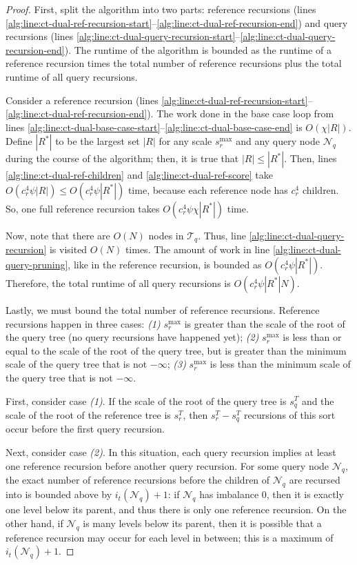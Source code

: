 \begin{proof}
First, split the algorithm into two parts: reference recursions (lines
\ref{alg:line:ct-dual-ref-recursion-start}--\ref{alg:line:ct-dual-ref-recursion-end})
and query recursions (lines
\ref{alg:line:ct-dual-query-recursion-start}--\ref{alg:line:ct-dual-query-recursion-end}).
The runtime of the algorithm is bounded as the runtime of a reference recursion
times the total number of reference recursions plus the total runtime of all
query recursions.

Consider a reference recursion (lines
\ref{alg:line:ct-dual-ref-recursion-start}--\ref{alg:line:ct-dual-ref-recursion-end}).
The work done in the base case loop from lines
\ref{alg:line:ct-dual-base-case-start}--\ref{alg:line:ct-dual-base-case-end} is
$O(\chi | R |)$.  Define $| R^* |$ to be the largest set $|R|$ for any scale
$s_r^{\max}$ and any query node $\mathscr{N}_q$ during the course of the
algorithm; then, it is true that $| R | \le | R^* |$.
%
Then, lines \ref{alg:line:ct-dual-ref-children} and
\ref{alg:line:ct-dual-ref-score} take $O(c_r^4 \psi | R |) \le O(c_r^4 \psi |
R^* |)$ time, because each reference node has $c_r^4$ children.  So, one
full reference recursion takes $O(c_r^4 \psi \chi | R^* |)$ time.

Now, note that there are $O(N)$ nodes in $\mathscr{T}_q$.  Thus, line
\ref{alg:line:ct-dual-query-recursion} is visited $O(N)$ times.  The amount of
work in line \ref{alg:line:ct-dual-query-pruning}, like in the reference
recursion, is bounded as $O(c_r^4 \psi | R^* |)$. Therefore, the total
runtime of all query recursions is $O(c_r^4 \psi | R^* | N)$.

Lastly, we must bound the total number of reference recursions.  Reference
recursions happen in three cases: \textit{(1)} $s_r^{\max}$ is greater than the
scale of the root of the query tree (no query recursions have happened yet);
\textit{(2)} $s_r^{\max}$ is less than or equal to the scale of the root of the
query tree, but is greater than the minimum scale of the query tree that is not
$-\infty$; \textit{(3)} $s_r^{\max}$ is less than the minimum scale of the query
tree that is not $-\infty$.

First, consider case \textit{(1)}.  If the scale of the root of the query tree
is $s_q^T$ and the scale of the root of the reference tree is $s_r^T$, then
$s_r^T - s_q^T$ recursions of this sort occur before the first query recursion.

Next, consider case \textit{(2)}.  In this situation, each query recursion
implies at least one reference recursion before another query recursion.  For
some query node $\mathscr{N}_q$, the
exact number of reference recursions before the children of $\mathscr{N}_q$ are
recursed into is bounded above by $i_t(\mathscr{N}_q) + 1$: if $\mathscr{N}_q$ has
imbalance $0$, then it is exactly one level below its parent, and thus there is
only one reference recursion.  On the other hand, if $\mathscr{N}_q$ is many
levels below its parent, then it is possible that a reference recursion may
occur for each level in between; this is a maximum of $i_t(\mathscr{N}_q) + 1$.


\end{proof}
